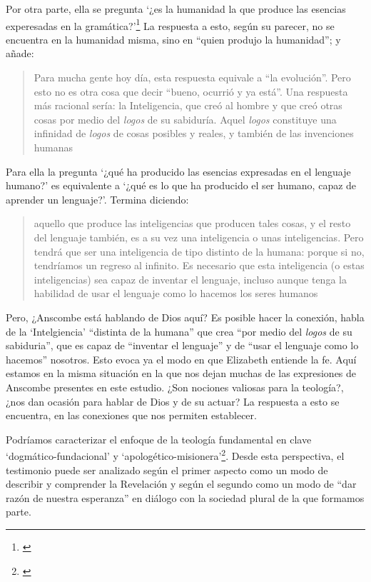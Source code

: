 Por otra parte, ella se pregunta \enquote*{¿es la humanidad la que produce las esencias experesadas en la gramática?}\footnote{\Cite[Cf.][72]{torralbaynubiola2005fayeh:esencia}} La respuesta a esto, según su parecer, no se encuentra en la humanidad misma, sino en \enquote{quien produjo la humanidad}; y añade: \blockquote[{\Cite[73]{torralbaynubiola2005fayeh:esencia}}]{Para mucha gente hoy día, esta respuesta equivale a ``la evolución''. Pero esto no es otra cosa que decir ``bueno, ocurrió y ya está''. Una respuesta más racional sería: la Inteligencia, que creó al hombre y que creó otras cosas por medio del \emph{logos} de su sabiduría. Aquel \emph{logos} constituye una infinidad de \emph{logos} de cosas posibles y reales, y también de las invenciones humanas}. Para ella la pregunta \enquote*{¿qué ha producido las esencias expresadas en el lenguaje humano?} es equivalente a \enquote*{¿qué es lo que ha producido el ser humano, capaz de aprender un lenguaje?}. Termina diciendo: \blockquote[{\Cite[74]{torralbaynubiola2005fayeh:esencia}}]{aquello que produce las inteligencias que producen tales cosas, y el resto del lenguaje también, es a su vez una inteligencia o unas inteligencias. Pero tendrá que ser una inteligencia de tipo distinto de la humana: porque si no, tendríamos un regreso al infinito. Es necesario que esta inteligencia (o estas inteligencias) sea capaz de inventar el lenguaje, incluso aunque tenga la habilidad de usar el lenguaje como lo hacemos los seres humanos}.

Pero, ¿Anscombe está hablando de Dios aquí? Es posible hacer la conexión, habla de la `Intelgiencia' ``distinta de la humana'' que crea ``por medio del \emph{logos} de su sabiduria'', que es capaz de ``inventar el lenguaje'' y de ``usar el lenguaje como lo hacemos'' nosotros. Esto evoca ya el modo en que Elizabeth entiende la fe. Aquí estamos en la misma situación en la que nos dejan muchas de las expresiones de Anscombe presentes en este estudio. ¿Son nociones valiosas para la teología?, ¿nos dan ocasión para hablar de Dios y de su actuar? La respuesta a esto se encuentra, en las conexiones que nos permiten establecer.

Podríamos caracterizar el enfoque de la teología fundamental en clave `dogmático-fundacional' y `apologético-misionera'\footnote{\Cite[Cf.][80-85]{ninot2009tf}}. Desde esta perspectiva, el testimonio puede ser analizado según el primer aspecto como un modo de describir y comprender la Revelación y según el segundo como un modo de ``dar razón de nuestra esperanza'' en diálogo con la sociedad plural de la que formamos parte.

